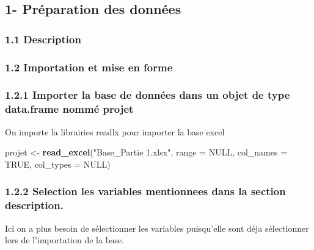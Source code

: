 \documentclass[
]{article}
\newenvironment{Shaded}{\begin{snugshade}}{\end{snugshade}}
\newcommand{\AttributeTok}[1]{\textcolor[rgb]{0.13,0.29,0.53}{#1}}
\newcommand{\ConstantTok}[1]{\textcolor[rgb]{0.56,0.35,0.01}{#1}}
\newcommand{\FunctionTok}[1]{\textcolor[rgb]{0.13,0.29,0.53}{\textbf{#1}}}
\newcommand{\NormalTok}[1]{#1}
\newcommand{\OtherTok}[1]{\textcolor[rgb]{0.56,0.35,0.01}{#1}}
\newcommand{\StringTok}[1]{\textcolor[rgb]{0.31,0.60,0.02}{#1}}
\begin{document}
\hypertarget{pruxe9paration-des-donnuxe9es}{%
\subsection{1- Préparation des
données}\label{pruxe9paration-des-donnuxe9es}}

\hypertarget{description}{%
\subsubsection{1.1 Description}\label{description}}

\hypertarget{importation-et-mise-en-forme}{%
\subsubsection{1.2 Importation et mise en
forme}\label{importation-et-mise-en-forme}}

\hypertarget{importer-la-base-de-donnuxe9es-dans-un-objet-de-type-data.frame-nommuxe9-projet}{%
\subsubsection{1.2.1 Importer la base de données dans un objet de type
data.frame nommé
projet}\label{importer-la-base-de-donnuxe9es-dans-un-objet-de-type-data.frame-nommuxe9-projet}}

On importe la librairies readlx pour importer la base excel

\begin{Shaded}
\begin{Highlighting}[]
\NormalTok{projet }\OtherTok{\textless{}{-}} \FunctionTok{read\_excel}\NormalTok{(}\StringTok{"Base\_Partie 1.xlsx"}\NormalTok{,}
                   \AttributeTok{range =} \ConstantTok{NULL}\NormalTok{,}
                  \AttributeTok{col\_names =} \ConstantTok{TRUE}\NormalTok{,}
                   \AttributeTok{col\_types =} \ConstantTok{NULL}\NormalTok{)}
\end{Highlighting}
\end{Shaded}

\hypertarget{selection-les-variables-mentionnees-dans-la-section-description.}{%
\subsubsection{1.2.2 Selection les variables mentionnees dans la section
description.}\label{selection-les-variables-mentionnees-dans-la-section-description.}}

Ici on a plus besoin de sélectionner les variables puisqu'elle sont déja
sélectionner lors de l'importation de la base.
\end{document}
